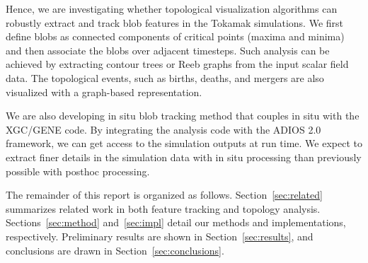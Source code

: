 Hence, we are investigating whether topological visualization algorithms can robustly extract and track blob features in the Tokamak simulations.  We first define blobs as connected components of critical points (maxima and minima) and then associate the blobs over adjacent timesteps.  Such analysis can be achieved by extracting contour trees or Reeb graphs from the input scalar field data.  The topological events, such as births, deaths, and mergers are also visualized with a graph-based representation. %

We are also developing in situ blob tracking method that couples in situ with the XGC/GENE code.  By integrating the analysis code with the ADIOS 2.0 framework, we can get access to the simulation outputs at run time.  We expect to extract finer details in the simulation data with in situ processing than previously possible with posthoc processing.  

The remainder of this report is organized as follows.  Section~\ref{sec:related} summarizes related work in both feature tracking and topology analysis.  Sections~\ref{sec:method} and~\ref{sec:impl} detail our methods and implementations, respectively.  Preliminary results are shown in Section~\ref{sec:results}, and conclusions are drawn in Section~\ref{sec:conclusions}.  